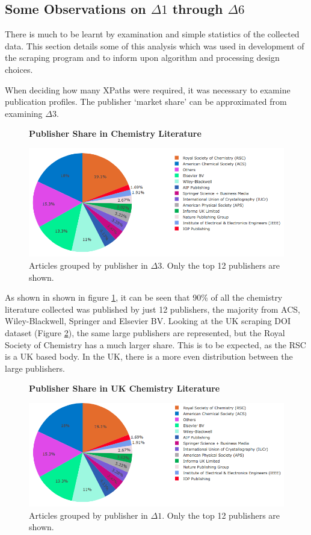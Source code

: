 \subsection{Some Observations on $\Delta1$ through $\Delta6$}
\label{sec:CORPUSOBSERVATIONS}
There is much to be learnt by examination and simple statistics of the collected data. This section details some of this analysis which was used in development of the scraping program and to inform upon algorithm and processing design choices.

When deciding how many XPaths were required, it was necessary to examine publication profiles.
The publisher `market share' can be approximated from examining $\Delta3$.
\begin{figure}[H]
    \centering
    \textbf{Publisher Share in Chemistry Literature}\par\medskip
    \includegraphics[width=\textwidth]{Data_Acquisition/publishers_pie2.png}
    \caption[Publisher Share in Chemistry Literature]{Articles grouped by publisher in $\Delta3$. Only the top 12 publishers are shown.}
     \label{fig:PUBPI}
\end{figure}
As shown in  shown in figure \ref{fig:PUBPI}, it can be seen that 90\% of all the chemistry literature collected was published by just 12 publishers, the majority from ACS, Wiley-Blackwell, Springer and Elsevier BV. Looking at the UK scraping DOI dataset (Figure \ref{fig:UKPUBPI}), the same large publishers are represented, but the Royal Society of Chemistry has a much larger share. This is to be expected, as the RSC is a UK based body. In the UK, there is a more even distribution between the large publishers. 

\begin{figure}[H]
    \centering
    \textbf{Publisher Share in UK Chemistry Literature}\par\medskip
    \includegraphics[width=\textwidth]{Data_Acquisition/uk_publishers_pie2.png}
    \caption[Publisher Share in UK Chemistry Literature]{Articles grouped by publisher in $\Delta1$. Only the top 12 publishers are shown.}
     \label{fig:UKPUBPI}
\end{figure}

